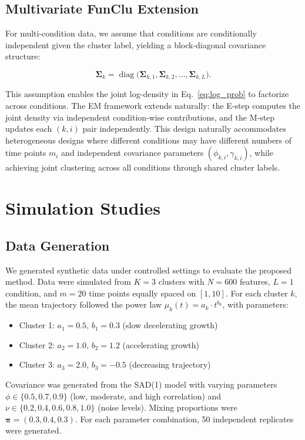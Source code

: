 \documentclass[12pt,a4paper]{article}
\DeclareMathOperator{\diag}{diag}
\begin{document}
\subsection{Multivariate FunClu Extension}

For multi-condition data, we assume that conditions are conditionally independent given the cluster label, yielding a block-diagonal covariance structure:

\begin{equation}\label{eq:block_diag}
    \bm{\Sigma}_k = \diag\bigl(\bm{\Sigma}_{k,1}, \bm{\Sigma}_{k,2}, \dots, \bm{\Sigma}_{k,L}\bigr).
\end{equation}

This assumption enables the joint log-density in Eq.~\ref{eq:log_prob} to factorize across conditions. The EM framework extends naturally: the E-step computes the joint density via independent condition-wise contributions, and the M-step updates each $(k,i)$ pair independently. This design naturally accommodates heterogeneous designs where different conditions may have different numbers of time points $m_i$ and independent covariance parameters $(\phi_{k,i}, \gamma_{k,i})$, while achieving joint clustering across all conditions through shared cluster labels.

\section{Simulation Studies}

\subsection{Data Generation}

We generated synthetic data under controlled settings to evaluate the proposed method. Data were simulated from $K=3$ clusters with $N=600$ features, $L=1$ condition, and $m=20$ time points equally spaced on $[1, 10]$. For each cluster $k$, the mean trajectory followed the power law $\mu_k(t) = a_k \cdot t^{b_k}$, with parameters:
\begin{itemize}[leftmargin=*]
    \item Cluster 1: $a_1 = 0.5$, $b_1 = 0.3$ (slow decelerating growth)
    \item Cluster 2: $a_2 = 1.0$, $b_2 = 1.2$ (accelerating growth)
    \item Cluster 3: $a_3 = 2.0$, $b_3 = -0.5$ (decreasing trajectory)
\end{itemize}
Covariance was generated from the SAD(1) model with varying parameters $\phi \in \{0.5, 0.7, 0.9\}$ (low, moderate, and high correlation) and $\nu \in \{0.2, 0.4, 0.6, 0.8, 1.0\}$ (noise levels). Mixing proportions were $\bm{\pi} = (0.3, 0.4, 0.3)$. For each parameter combination, 50 independent replicates were generated.
\end{document}
